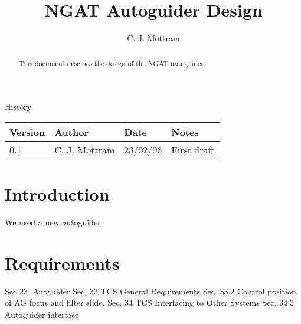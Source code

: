\documentclass[10pt,a4paper]{article}
\title{NGAT Autoguider Design}
\author{C. J. Mottram}
\date{}
\begin{document}
\thispagestyle{empty}
\maketitle
\begin{abstract}
This document descibes the design of the NGAT autoguider.
\end{abstract}

\centerline{\Large History}
\begin{center}
\begin{tabular}{|l|l|l|p{15em}|}
\hline
{\bf Version} & {\bf Author} & {\bf Date} & {\bf Notes} \\
\hline
0.1 & C. J. Mottram & 23/02/06 & First draft \\
\hline
\end{tabular}
\end{center}

\newpage
\tableofcontents
\listoffigures
\listoftables
\newpage

\section{Introduction}
We need a new autoguider.

\section{Requirements}

Sec 23. Auoguider
Sec. 33 TCS General Requirements
  Sec. 33.2  Control position of AG focus and filter slide.
Sec. 34 TCS Interfacing to Other Systems
  Sec. 34.3 Autoguider interface


\begin{thebibliography}{99}
\end{thebibliography}
\end{document}
